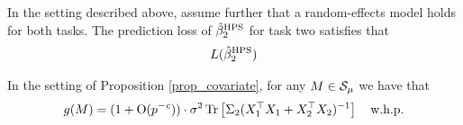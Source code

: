 \begin{corollary}\label{prop_covariate}
	In the setting described above, assume further that a random-effects model holds for both tasks.
	The prediction loss of $\hat{\beta}_2^{\MTL}$ for task two satisfies that
	\begin{align*}
		L(\hat{\beta}_2^{\MTL})
	\end{align*}
\end{corollary}


\iffalse

 \begin{claim}\label{claim_covar_shift}
		In the setting of Proposition \ref{prop_covariate}, for any $M\in \cal S_\mu$ we have that
		\[ g(M)=(1+\OO(p^{-\e}))\cdot \sigma^2  \bigtr{\Sigma_2(X_1^{\top}X_1  + X_2^{\top}X_2)^{-1} }  \quad \text{w.h.p.} \]
	\end{claim}


